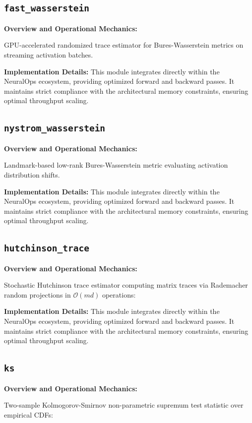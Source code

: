 \subsection{\texttt{fast\_wasserstein}}
\textbf{Overview and Operational Mechanics:}

GPU-accelerated randomized trace estimator for Bures-Wasserstein metrics on streaming activation batches.

\textbf{Implementation Details:}
This module integrates directly within the NeuralOps ecosystem, providing optimized forward and backward passes. It maintains strict compliance with the architectural memory constraints, ensuring optimal throughput scaling.

\subsection{\texttt{nystrom\_wasserstein}}
\textbf{Overview and Operational Mechanics:}

Landmark-based low-rank Bures-Wasserstein metric evaluating activation distribution shifts.

\textbf{Implementation Details:}
This module integrates directly within the NeuralOps ecosystem, providing optimized forward and backward passes. It maintains strict compliance with the architectural memory constraints, ensuring optimal throughput scaling.

\subsection{\texttt{hutchinson\_trace}}
\textbf{Overview and Operational Mechanics:}

Stochastic Hutchinson trace estimator computing matrix traces via Rademacher random projections in $\mathcal{O}(m d)$ operations:

\textbf{Implementation Details:}
This module integrates directly within the NeuralOps ecosystem, providing optimized forward and backward passes. It maintains strict compliance with the architectural memory constraints, ensuring optimal throughput scaling.

\subsection{\texttt{ks}}
\textbf{Overview and Operational Mechanics:}

Two-sample Kolmogorov-Smirnov non-parametric supremum test statistic over empirical CDFs:

